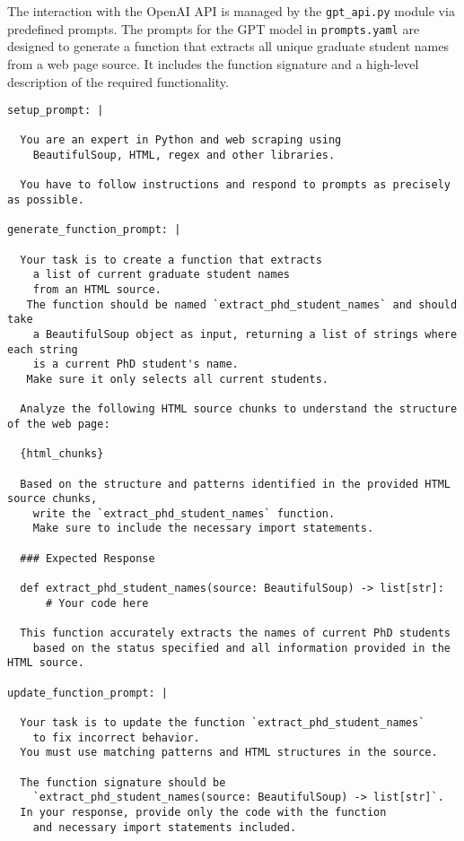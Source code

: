 \documentclass[11pt]{article}
\begin{document}

The interaction with the OpenAI API is managed by the \texttt{gpt\_api.py} module via predefined prompts. The prompts for the GPT model in \texttt{prompts.yaml} are designed to generate a function that extracts all unique graduate student names from a web page source. It includes the function signature and a high-level description of the required functionality.
%
\begin{verbatim}
setup_prompt: |

  You are an expert in Python and web scraping using
    BeautifulSoup, HTML, regex and other libraries.

  You have to follow instructions and respond to prompts as precisely as possible.

generate_function_prompt: |

  Your task is to create a function that extracts
    a list of current graduate student names
    from an HTML source.
   The function should be named `extract_phd_student_names` and should take
    a BeautifulSoup object as input, returning a list of strings where each string
    is a current PhD student's name.
   Make sure it only selects all current students.

  Analyze the following HTML source chunks to understand the structure of the web page:

  {html_chunks}

  Based on the structure and patterns identified in the provided HTML source chunks,
    write the `extract_phd_student_names` function.
    Make sure to include the necessary import statements.

  ### Expected Response

  def extract_phd_student_names(source: BeautifulSoup) -> list[str]:
      # Your code here

  This function accurately extracts the names of current PhD students
    based on the status specified and all information provided in the HTML source.

update_function_prompt: |

  Your task is to update the function `extract_phd_student_names`
    to fix incorrect behavior.
  You must use matching patterns and HTML structures in the source.

  The function signature should be
    `extract_phd_student_names(source: BeautifulSoup) -> list[str]`.
  In your response, provide only the code with the function
    and necessary import statements included.


\end{verbatim}
\end{document}
